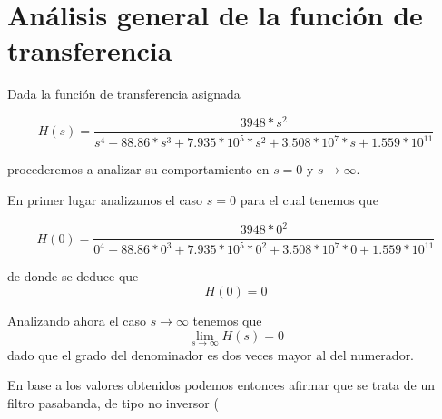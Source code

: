 \documentclass[11pt,a4paper]{report}
\author{Marcos}
\begin{document}
\section*{Análisis general de la función de transferencia}

Dada la función de transferencia asignada

\[H(s)=\frac{3948*s^2}{s^4+88.86*s^3+7.935*10^5*s^2+3.508*10^7*s+1.559*10^{11}}\]

\bigskip
procederemos a analizar su comportamiento en $s=0$ y $s\longrightarrow\infty$.

\bigskip
En primer lugar analizamos el caso $s=0$ para el cual tenemos que 

\[H(0) = \frac{3948*0^2}{0^4+88.86*0^3+7.935*10^5*0^2+3.508*10^7*0+1.559*10^{11}}\]

\bigskip
de donde se deduce que
\[H(0) = 0\]

Analizando ahora el caso $s\longrightarrow\infty$ tenemos que
\[\lim_{s \to \infty} H(s) = 0\]
dado que el grado del denominador es dos veces mayor al del numerador.

\bigskip
En base a los valores obtenidos podemos entonces afirmar que se trata de un
filtro pasabanda, de tipo no inversor (
\end{document}
